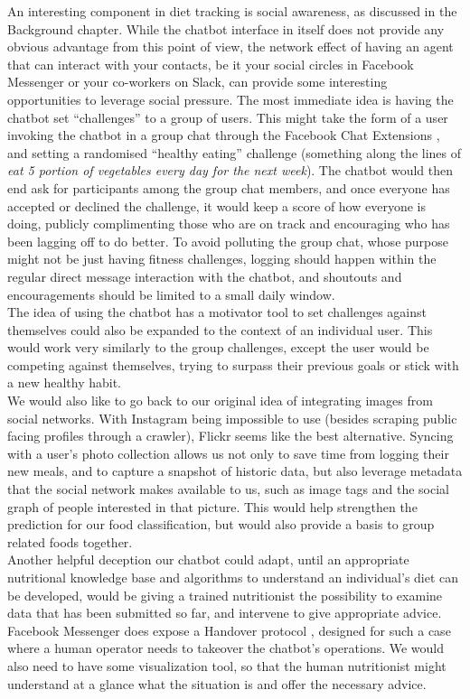 An interesting component in diet tracking is social awareness, as discussed in the Background chapter. While the chatbot interface in itself does not provide any obvious advantage from this point of view, the network effect of having an agent that can interact with your contacts, be it your social circles in Facebook Messenger or your co-workers on Slack, can provide some interesting opportunities to leverage social pressure. The most immediate idea is having the chatbot set ``challenges'' to a group of users. This might take the form of a user invoking the chatbot in a group chat through the Facebook Chat Extensions \cite{chatextensions}, and setting a randomised ``healthy eating'' challenge (something along the lines of \textit{eat 5 portion of vegetables every day for the next week}). The chatbot would then end ask for participants among the group chat members, and once everyone has accepted or declined the challenge, it would keep a score of how everyone is doing, publicly complimenting those who are on track and encouraging who has been lagging off to do better. To avoid polluting the group chat, whose purpose might not be just having fitness challenges, logging should happen within the regular direct message interaction with the chatbot, and shoutouts and encouragements should be limited to a small daily window. \\
The idea of using the chatbot has a motivator tool to set challenges against themselves could also be expanded to the context of an individual user. This would work very similarly to the group challenges, except the user would be competing against themselves, trying to surpass their previous goals or stick with a new healthy habit. \\
We would also like to go back to our original idea of integrating images from social networks. With Instagram being impossible to use (besides scraping public facing profiles through a crawler), Flickr seems like the best alternative. Syncing with a user's photo collection allows us not only to save time from logging their new meals, and to capture a snapshot of historic data, but also leverage metadata that the social network makes available to us, such as image tags and the social graph of people interested in that picture. This would help strengthen the prediction for our food classification, but would also provide a basis to group related foods together. \\
Another helpful deception our chatbot could adapt, until an appropriate nutritional knowledge base and algorithms to understand an individual's diet can be developed, would be giving a trained nutritionist the possibility to examine data that has been submitted so far, and intervene to give appropriate advice. Facebook Messenger does expose a Handover protocol \cite{handoverfaceboo}, designed for such a case where a human operator needs to takeover the chatbot's operations. We would also need to have some visualization tool, so that the human nutritionist might understand at a glance what the situation is and offer the necessary advice.

